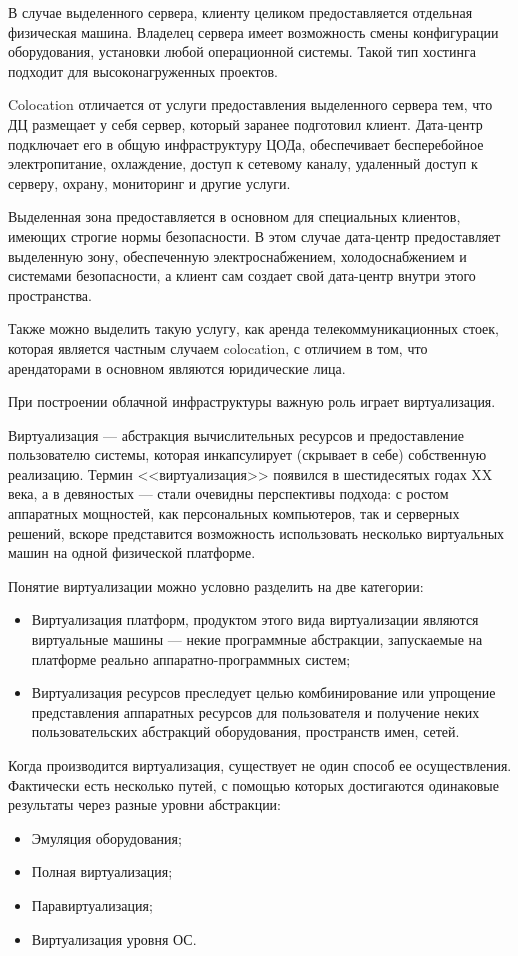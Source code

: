 В случае выделенного сервера, клиенту целиком предоставляется отдельная физическая машина.
Владелец сервера имеет возможность смены конфигурации оборудования, установки любой операционной системы.
Такой тип хостинга подходит для высоконагруженных проектов.

Colocation отличается от услуги предоставления выделенного сервера тем, что ДЦ размещает у себя сервер, который заранее подготовил клиент.
Дата-центр подключает его в общую инфраструктуру ЦОДа, обеспечивает бесперебойное электропитание, охлаждение, доступ к сетевому каналу, удаленный доступ к серверу, охрану, мониторинг и другие услуги.

Выделенная зона предоставляется в основном для специальных клиентов, имеющих строгие нормы безопасности.
В этом случае дата-центр предоставляет выделенную зону, обеспеченную электроснабжением, холодоснабжением и системами безопасности, а клиент сам создает свой дата-центр внутри этого пространства.

Также можно выделить такую услугу, как аренда телекоммуникационных стоек, которая является частным случаем colocation, с отличием в том, что арендаторами в основном являются юридические лица.

При построении облачной инфраструктуры важную роль играет виртуализация.

Виртуализация --- абстракция вычислительных ресурсов и предоставление пользователю системы, которая инкапсулирует (скрывает в себе) собственную реализацию.
Термин <<виртуализация>> появился в шестидесятых годах XX века, а в девяностых --- стали очевидны перспективы подхода: с ростом аппаратных мощностей, как персональных компьютеров, так и серверных решений, вскоре представится возможность использовать несколько виртуальных машин на одной физической платформе.

Понятие виртуализации можно условно разделить на две категории:
\begin{itemize}
  \item Виртуализация платформ, продуктом этого вида виртуализации являются виртуальные машины --- некие программные абстракции, запускаемые на платформе реально аппаратно-программных систем;
  \item Виртуализация ресурсов преследует целью комбинирование или упрощение представления аппаратных ресурсов для пользователя и получение неких пользовательских абстракций оборудования, пространств имен, сетей.
\end{itemize}

Когда производится виртуализация, существует не один способ ее осуществления.
Фактически есть несколько путей, с помощью которых достигаются одинаковые результаты через разные уровни абстракции: \cite{openvz-tutorial}
\begin{itemize}
  \item Эмуляция оборудования;
  \item Полная виртуализация;
  \item Паравиртуализация;
  \item Виртуализация уровня ОС.
\end{itemize}

